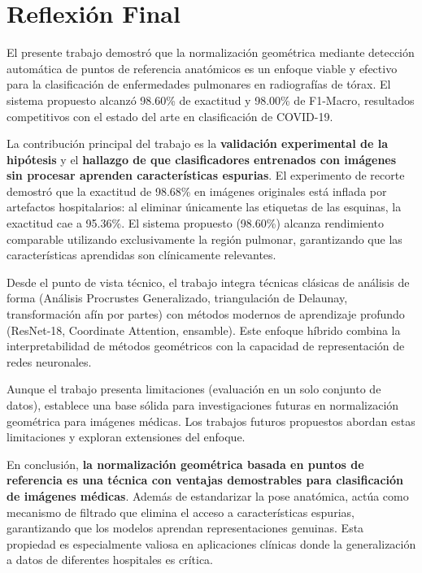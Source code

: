 \section{Reflexión Final}
\label{sec:reflexion_final}

El presente trabajo demostró que la normalización geométrica mediante detección automática de puntos de referencia anatómicos es un enfoque viable y efectivo para la clasificación de enfermedades pulmonares en radiografías de tórax. El sistema propuesto alcanzó 98.60\% de exactitud y 98.00\% de F1-Macro, resultados competitivos con el estado del arte en clasificación de COVID-19.

La contribución principal del trabajo es la \textbf{validación experimental de la hipótesis} y el \textbf{hallazgo de que clasificadores entrenados con imágenes sin procesar aprenden características espurias}. El experimento de recorte demostró que la exactitud de 98.68\% en imágenes originales está inflada por artefactos hospitalarios: al eliminar únicamente las etiquetas de las esquinas, la exactitud cae a 95.36\%. El sistema propuesto (98.60\%) alcanza rendimiento comparable utilizando exclusivamente la región pulmonar, garantizando que las características aprendidas son clínicamente relevantes.

Desde el punto de vista técnico, el trabajo integra técnicas clásicas de análisis de forma (Análisis Procrustes Generalizado, triangulación de Delaunay, transformación afín por partes) con métodos modernos de aprendizaje profundo (ResNet-18, Coordinate Attention, ensamble). Este enfoque híbrido combina la interpretabilidad de métodos geométricos con la capacidad de representación de redes neuronales.

Aunque el trabajo presenta limitaciones (evaluación en un solo conjunto de datos), establece una base sólida para investigaciones futuras en normalización geométrica para imágenes médicas. Los trabajos futuros propuestos abordan estas limitaciones y exploran extensiones del enfoque.

En conclusión, \textbf{la normalización geométrica basada en puntos de referencia es una técnica con ventajas demostrables para clasificación de imágenes médicas}. Además de estandarizar la pose anatómica, actúa como mecanismo de filtrado que elimina el acceso a características espurias, garantizando que los modelos aprendan representaciones genuinas. Esta propiedad es especialmente valiosa en aplicaciones clínicas donde la generalización a datos de diferentes hospitales es crítica.
